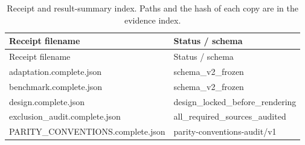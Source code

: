 \begingroup\small
\setlength{\tabcolsep}{4pt}
\begin{longtable}{>{\raggedright\arraybackslash}p{.49\linewidth}>{\raggedright\arraybackslash}p{.44\linewidth}}
\caption{Receipt and result-summary index. Paths and the hash of each copy are in the evidence index.}\label{tab:receipts}\\
\toprule
Receipt filename & %
Status / schema \\ %
\midrule

\endfirsthead
\toprule
Receipt filename & %
Status / schema \\ %
\midrule

\endhead
\bottomrule\endfoot
adaptation.complete.json & %
schema\_\allowbreak{}v2\_\allowbreak{}frozen \\ %

benchmark.complete.json & %
schema\_\allowbreak{}v2\_\allowbreak{}frozen \\ %

design.complete.json & %
design\_\allowbreak{}locked\_\allowbreak{}before\_\allowbreak{}rendering \\ %

exclusion\_\allowbreak{}audit.complete.json & %
all\_\allowbreak{}required\_\allowbreak{}sources\_\allowbreak{}audited \\ %

PARITY\_\allowbreak{}CONVENTIONS.complete.json & %
parity-conventions-audit/v1 \\ %


\end{longtable}
